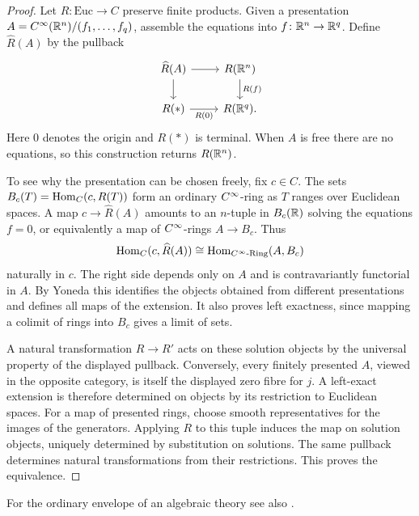 \begin{proof}
  Let $R\colon\mathrm{Euc}\to C$ preserve finite products. Given a
  presentation $A=C^\infty(\mathbb{R}^n)/(f_1,\ldots,f_q)$, assemble the
  equations into $f\colon\mathbb{R}^n\to\mathbb{R}^q$. Define $\widehat R(A)$ by the pullback
  \[
  \begin{tikzcd}
    \widehat R(A) \rar \dar & R(\R^n) \dar["R(f)"] \\
    R(*) \rar["R(0)"'] & R(\R^q).
  \end{tikzcd}
  \]
  Here $0$ denotes the origin and $R(*)$ is terminal. When $A$ is free
  there are no equations, so this construction returns $R(\mathbb{R}^n)$.

  To see why the presentation can be chosen freely, fix $c\in C$.
  The sets $B_c(T)=\operatorname{Hom}_C(c,R(T))$ form an ordinary $C^\infty$-ring
  as $T$ ranges over Euclidean spaces. A map $c\to\widehat R(A)$
  amounts to an $n$-tuple in $B_c(\mathbb{R})$ solving the equations $f=0$,
  or equivalently a map of $C^\infty$-rings $A\to B_c$. Thus
  \[
    \operatorname{Hom}_C(c,\widehat R(A))\cong
    \operatorname{Hom}_{C^\infty\text{-}\mathrm{Ring}}(A,B_c)
  \]
  naturally in $c$. The right side depends only on $A$ and is
  contravariantly functorial in $A$. By Yoneda this identifies
  the objects obtained from different presentations and defines all
  maps of the extension. It also proves left exactness, since mapping
  a colimit of rings into $B_c$ gives a limit of sets.

  A natural transformation $R\to R'$ acts on these solution objects
  by the universal property of the displayed pullback. Conversely,
  every finitely presented $A$, viewed in the opposite category, is
  itself the displayed zero fibre for $j$. A left-exact extension is
  therefore determined on objects by its restriction to Euclidean
  spaces. For a map of presented rings, choose smooth representatives
  for the images of the generators. Applying $R$ to this tuple induces
  the map on solution objects, uniquely determined by substitution on
  solutions. The same pullback determines natural
  transformations from their restrictions. This proves the equivalence.
\end{proof}

For the ordinary envelope of an algebraic theory see also
\citet[Remark~3.26]{Carchedi_Steffens_Universal_Derived_Manifolds}.

